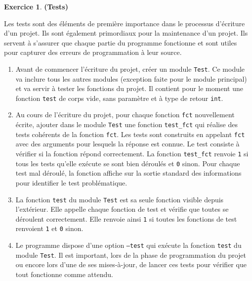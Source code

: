 \documentclass[11pt]{article}
\theoremstyle{definition}
\newtheorem{Exercice}{Exercice}
\begin{document}
\begin{Exercice} {\bf (Tests)}\smallskip
\label{exo:test}

Les tests sont des éléments de première importance dans le processus
d'écriture d'un projet. Ils sont également primordiaux pour la
maintenance d'un projet. Ils servent à s'assurer que chaque partie du
programme fonctionne et sont utiles pour capturer des erreurs de
programmation à leur source.
\smallskip

\begin{enumerate}
    \item Avant de commencer l'écriture du projet, créer un module
    {\tt Test}. Ce module va inclure tous les autres modules (exception
    faite pour le module principal) et va servir à tester les fonctions
    du projet. Il contient pour le moment une fonction {\tt test} de
    corps vide, sans paramètre et à type de retour {\tt int}.
    \smallskip

    \item Au cours de l'écriture du projet, pour chaque fonction
    {\tt fct} nouvellement écrite, ajouter dans le module {\tt Test} une
    fonction {\tt test\_fct} qui réalise des tests cohérents de la
    fonction {\tt fct}. Les tests sont construits en appelant {\tt fct}
    avec des arguments pour lesquels la réponse est connue. Le test
    consiste à vérifier si la fonction répond correctement. La fonction
    {\tt test\_fct} renvoie {\tt 1} si tous les tests qu'elle exécute se
    sont bien déroulés et {\tt 0} sinon. Pour chaque test mal déroulé,
    la fonction affiche sur la sortie standard des informations pour
    identifier le test problématique.
    \smallskip

    \item La fonction {\tt test} du module {\tt Test} est sa seule
    fonction visible depuis l'extérieur. Elle appelle chaque fonction
    de test et vérifie que toutes se déroulent correctement. Elle
    renvoie ainsi {\tt 1} si toutes les fonctions de test renvoient
    {\tt 1} et {\tt 0} sinon.
    \smallskip

    \item Le programme dispose d'une option {\tt --test} qui exécute
    la fonction {\tt test} du module {\tt Test}. Il est important, lors
    de la phase de programmation du projet ou encore lors d'une de ses
    mises-à-jour, de lancer ces tests pour vérifier que tout fonctionne
    comme attendu.
\end{enumerate}
\end{Exercice}
\bigskip
\bigskip
\end{document}
